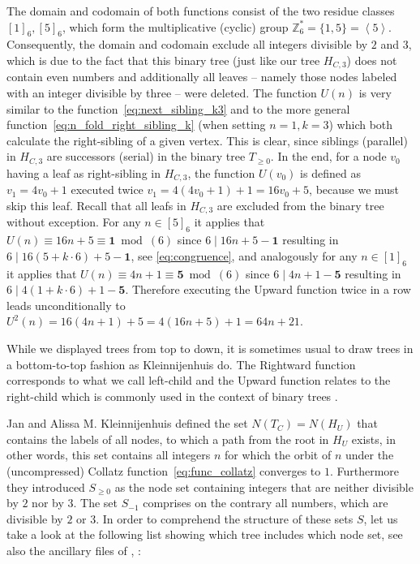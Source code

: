 The domain and codomain of both functions consist of the two residue classes $[1]_6,[5]_6$, which form the multiplicative (cyclic) group $\mathbb{Z}^\ast_6=\{1,5\}=\left<5\right>$. Consequently, the domain and codomain exclude all integers divisible by $2$ and $3$, which is due to the fact that this binary tree (just like our tree $H_{C,3}$) does not contain even numbers and additionally all leaves -- namely those nodes labeled with an integer divisible by three -- were deleted. The function $U(n)$ is very similar to the function~\ref{eq:next_sibling_k3} and to the more general function~\ref{eq:n_fold_right_sibling_k} (when setting $n=1,k=3$) which both calculate the right-sibling of a given vertex. This is clear, since siblings (parallel) in $H_{C,3}$ are successors (serial) in the binary tree $T_{\ge0}$. In the end, for a node $v_0$ having a leaf as right-sibling in $H_{C,3}$, the function $U(v_0)$ is defined as $v_1=4v_0+1$ executed twice $v_1=4(4v_0+1)+1=16v_0+5$, because we must skip this leaf. Recall that all leafs in $H_{C,3}$ are excluded from the binary tree without exception. For any $n\in[5]_6$ it applies that $U(n)\equiv16n+5\equiv\boldsymbol{1}\bmod(6)$ since $6\mid16n+5-\boldsymbol{1}$ resulting in $6\mid16(5+k\cdot6)+5-\boldsymbol{1}$, see \ref{eq:congruence}, and analogously for any $n\in[1]_6$ it applies that $U(n)\equiv4n+1\equiv\boldsymbol{5}\bmod(6)$ since $6\mid4n+1-\boldsymbol{5}$ resulting in $6\mid4(1+k\cdot6)+1-\boldsymbol{5}$. Therefore executing the Upward function twice in a row leads unconditionally to $U^2(n)=16(4n+1)+5=4(16n+5)+1=64n+21$.

\begin{remark}
	While we displayed trees from top to down, it is sometimes usual to draw trees in a bottom-to-top fashion as Kleinnijenhuis \cite{Ref_Kleinnijenhuis_2020b} do. The Rightward function corresponds to what we call left-child and the Upward function relates to the right-child which is commonly used in the context of binary trees \cite[p. 246]{Ref_Mazur_2010}.
\end{remark}

Jan and Alissa M. Kleinnijenhuis \cite{Ref_Kleinnijenhuis_2020a} defined the set $N(T_C)=N(H_U)$ that contains the labels of all nodes, to which a path from the root in $H_U$ exists, in other words, this set contains all integers $n$ for which the orbit of $n$ under the (uncompressed) Collatz function~\ref{eq:func_collatz} converges to $1$. Furthermore they introduced $S_{\ge0}$ as the node set containing integers that are neither divisible by $2$ nor by $3$. The set $S_{-1}$ comprises on the contrary all numbers, which are divisible by $2$ or $3$. In order to comprehend the structure of these sets $S$, let us take a look at the following list showing which tree includes which node set, see also the ancillary files of \cite{Ref_Kleinnijenhuis_2020a}, \cite{Ref_Kleinnijenhuis_2020b}:

